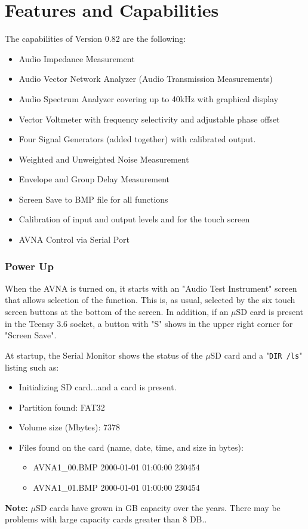 \part{Features and Capabilities}
The capabilities of Version 0.82 are the following:
\begin{itemize}
\item Audio Impedance Measurement
\item Audio Vector Network Analyzer (Audio Transmission Measurements)
\item Audio Spectrum Analyzer covering up to 40kHz with graphical display
\item Vector Voltmeter with frequency selectivity and adjustable phase offset
\item Four Signal Generators (added together)  with calibrated output.
\item Weighted and Unweighted Noise Measurement
\item Envelope and Group Delay Measurement
\item Screen Save to BMP file for all functions
\item Calibration of input and output levels and for the touch screen
\item AVNA Control via Serial Port
\end{itemize}

\section{Power Up}When the AVNA is turned on, it starts with an "Audio Test Instrument" screen that allows selection of the function.  This is, as usual, selected by the six touch screen buttons at the bottom of the screen.  In addition, if an $\mu$SD card is present in the Teensy 3.6 socket, a button with "S"  shows in the upper right corner for "Screen Save".

At startup, the Serial Monitor shows the status of the $\mu$SD card and a "\texttt{DIR /ls}" listing such as: 
\begin{itemize}
  \item Initializing SD card...and a card is present.
  \item Partition found: FAT32
  \item Volume size (Mbytes): 7378
  \item Files found on the card (name, date, time, and size in bytes):
  \begin{itemize}
   \item AVNA1\_00.BMP  2000-01-01 01:00:00 230454
   \item AVNA1\_01.BMP  2000-01-01 01:00:00 230454
   \end{itemize}
\end{itemize}

\textbf{Note:} $\mu$SD cards have grown in GB capacity over the years.  There may be problems with large capacity cards greater than 8 DB..
